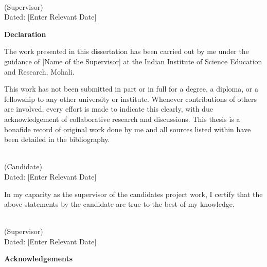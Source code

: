 \documentclass[a4paper, 12pt, twoside]{report}
\begin{document}
\vspace{4cm}

\begin{flushright}
    \\
    (Supervisor)
    \\
    \vspace{4cm}
    Dated: [Enter Relevant Date]
\end{flushright}

\cleardoublepage

\begin{center}
    \textbf{\Large Declaration}
\end{center}
The work presented in this dissertation has been carried out by me under the guidance of [Name of the Supervisor] at the Indian Institute of Science Education and Research, Mohali.

\vspace{0.4cm}

This work has not been submitted in part or in full for a degree, a diploma, or a fellowship to any other university or institute. Whenever contributions of others are involved, every effort is made to indicate this clearly, with due acknowledgement of collaborative research and discussions. This thesis is a bonafide record of original work done by me and all sources listed within have been detailed in the bibliography.

\vspace{2cm}

\begin{flushright}
\\
(Candidate)
\\
Dated: [Enter Relevant Date]
\end{flushright}

In my capacity as the supervisor of the candidates project work, I certify that the above statements by the candidate are true to the best of my knowledge.

\vspace{2cm}

\begin{flushright}
\\
(Supervisor)
\\
Dated: [Enter Relevant Date]
\end{flushright}

\cleardoublepage

\begin{center}
\textbf{\Large Acknowledgements}
\end{center}
\end{document}
